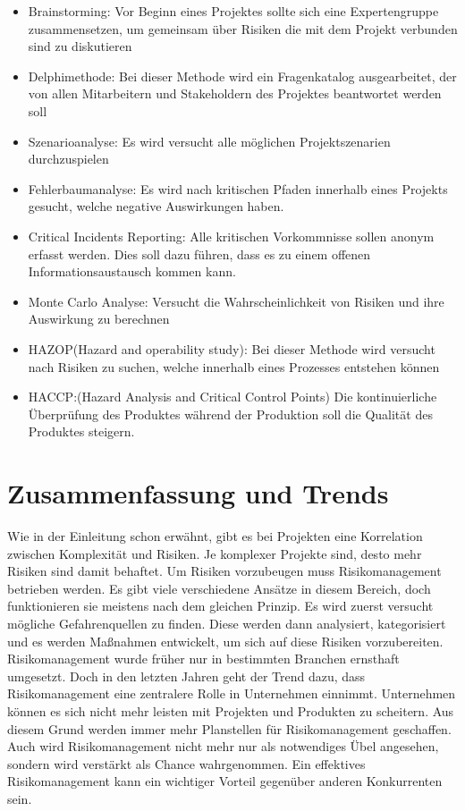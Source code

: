\documentclass{report}
\begin{document}
\begin{itemize}
\item Brainstorming: Vor Beginn eines Projektes sollte sich eine Expertengruppe zusammensetzen, um gemeinsam über Risiken die mit dem Projekt verbunden sind zu diskutieren
\item Delphimethode: Bei dieser Methode wird ein Fragenkatalog ausgearbeitet, der von allen Mitarbeitern und Stakeholdern des Projektes beantwortet werden soll
\item Szenarioanalyse: Es wird versucht alle möglichen Projektszenarien durchzuspielen  
\item Fehlerbaumanalyse: Es wird nach kritischen Pfaden innerhalb eines Projekts gesucht, welche negative Auswirkungen haben.
\item Critical Incidents Reporting: Alle kritischen Vorkommnisse sollen anonym  erfasst werden. Dies soll dazu führen, dass es zu einem offenen Informationsaustausch kommen kann. 
\item Monte Carlo Analyse: Versucht die Wahrscheinlichkeit von Risiken und ihre Auswirkung zu berechnen
\item HAZOP(Hazard and operability study): Bei dieser Methode wird versucht nach Risiken zu suchen, welche innerhalb eines Prozesses entstehen können
\item HACCP:(Hazard Analysis and Critical Control Points) Die kontinuierliche Überprüfung des Produktes während der Produktion soll die Qualität des Produktes steigern. 
\end{itemize}
\section{Zusammenfassung und Trends}
Wie in der Einleitung schon erwähnt, gibt es bei Projekten eine Korrelation zwischen Komplexität und Risiken. Je komplexer Projekte sind, desto mehr Risiken sind damit behaftet. Um Risiken vorzubeugen muss Risikomanagement betrieben werden. Es gibt viele verschiedene Ansätze in diesem Bereich, doch funktionieren sie meistens nach dem gleichen Prinzip. Es wird zuerst versucht mögliche Gefahrenquellen zu finden. Diese werden dann analysiert, kategorisiert und es werden Maßnahmen entwickelt, um sich auf diese Risiken vorzubereiten. 
\newline
\newline
Risikomanagement wurde früher nur in bestimmten Branchen ernsthaft umgesetzt. Doch in den letzten Jahren geht der Trend dazu, dass Risikomanagement eine zentralere Rolle in Unternehmen einnimmt. Unternehmen können es sich nicht mehr leisten mit Projekten und Produkten zu scheitern. Aus diesem Grund werden immer mehr Planstellen für Risikomanagement geschaffen.
\newline
\newline
Auch wird Risikomanagement nicht mehr nur als notwendiges Übel angesehen, sondern wird verstärkt als Chance wahrgenommen. Ein effektives Risikomanagement kann ein wichtiger Vorteil gegenüber anderen Konkurrenten sein. 
\end{document}
